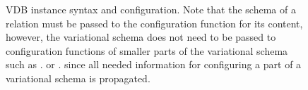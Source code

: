 \begin{figure}
\caption{VDB instance syntax and configuration.
Note that the schema of a relation must be passed to the configuration function
for its content,
however, the variational schema does not need to be passed to configuration 
functions of smaller parts of the variational schema such as \orSem .  or \olSem .
since all needed information for configuring a part of a variational schema
is propagated. 
}
\label{fig:vdb-conf}
\end{figure} 
